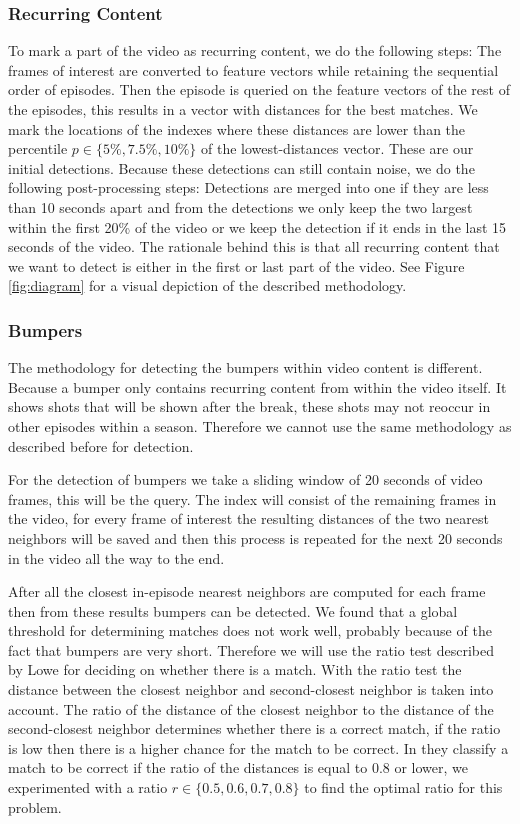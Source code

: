\documentclass{article}
\begin{document}
\subsubsection{Recurring Content}
To mark a part of the video as recurring content, we do the following steps: The frames of interest are converted to feature vectors while retaining the sequential order of episodes. Then the episode is queried on the feature vectors of the rest of the episodes, this results in a vector with distances for the best matches. We mark the locations of the indexes where these distances are lower than the percentile $p \in \{5\%, 7.5\%, 10\%\}$ of the lowest-distances vector. These are our initial detections. Because these detections can still contain noise, we do the following post-processing steps: Detections are merged into one if they are less than 10 seconds apart and from the detections we only keep the two largest within the first 20\% of the video or we keep the detection if it ends in the last 15 seconds of the video. The rationale behind this is that all recurring content that we want to detect is either in the first or last part of the video. See Figure \ref{fig:diagram} for a visual depiction of the described methodology.

\subsubsection{Bumpers}
The methodology for detecting the bumpers within video content is different. Because a bumper only contains recurring content from within the video itself. It shows shots that will be shown after the break, these shots may not reoccur in other episodes within a season. Therefore we cannot use the same methodology as described before for detection.

For the detection of bumpers we take a sliding window of 20 seconds of video frames, this will be the query. The index will consist of the remaining frames in the video, for every frame of interest the resulting distances of the two nearest neighbors will be saved and then this process is repeated for the next 20 seconds in the video all the way to the end.

After all the closest in-episode nearest neighbors are computed for each frame then from these results bumpers can be detected. We found that a global threshold for determining matches does not work well, probably because of the fact that bumpers are very short. Therefore we will use the ratio test described by Lowe \cite{lowe2004distinctive} for deciding on whether there is a match. With the ratio test the distance between the closest neighbor and second-closest neighbor is taken into account. The ratio of the distance of the closest neighbor to the distance of the second-closest neighbor determines whether there is a correct match, if the ratio is low then there is a higher chance for the match to be correct. In \cite{lowe2004distinctive} they classify a match to be correct if the ratio of the distances is equal to 0.8 or lower, we experimented with a ratio $r \in \{0.5, 0.6, 0.7, 0.8\}$ to find the optimal ratio for this problem.
\end{document}
